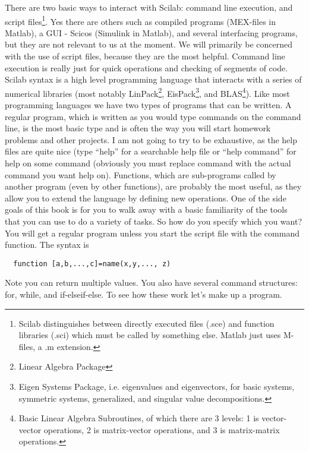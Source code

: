 There are two basic ways to interact with Scilab: command line execution, and script files\footnote{Scilab distinguishes between directly executed files (.sce) and function libraries (.sci) which must be called by something else.  Matlab just uses M-files, a .m extension.}. Yes there are others such as compiled programs (MEX-files in Matlab), a GUI - Scicos (Simulink in Matlab), and several interfacing programs, but they are not relevant to us at the moment.  We will primarily be concerned with the use of script files, because they are the most helpful.  Command line execution is really just for quick operations and checking of segments of code.  Scilab syntax is a high level programming language that interacts with a series of numerical libraries (most notably LinPack\footnote{Linear Algebra Package}, EisPack\footnote{Eigen Systems Package, i.e. eigenvalues and eigenvectors, for basic systems, symmetric systems, generalized, and singular value decompositions.}, and BLAS\footnote{Basic Linear Algebra Subroutines, of which there are 3 levels: 1 is vector-vector operations, 2 is matrix-vector operations, and 3 is matrix-matrix operations.}).  Like most programming languages we have two types of programs that can be written.  A regular program, which is written as you would type commands on the command line, is the most basic type and is often the way you will start homework problems and other projects.  I am not going to try to be exhaustive, as the help files are quite nice (type ``help'' for a searchable help file or ``help command'' for help on some command (obviously you must replace command with the actual command you want help on).  Functions, which are sub-programs called by another program (even by other functions), are probably the most useful, as they allow you to extend the language by defining new operations.  One of the side goals of this book is for you to walk away with a basic familiarity of the tools that you can use to do a variety of tasks.  So how do you specify which you want?  You will get a regular program unless you start the script file with the command function.  The syntax is

\begin{verbatim}
  function [a,b,...,c]=name(x,y,..., z)
\end{verbatim}

Note you can return multiple values.  You also have several command structures: for, while, and if-elseif-else.  To see how these work let's make up a program.


